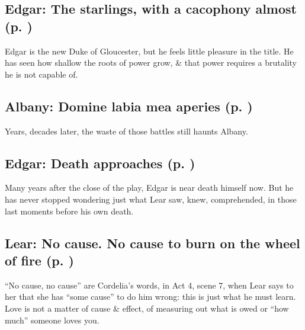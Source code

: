 \subsection*{Edgar: The starlings, with a cacophony almost (p. \pageref{ch:lear_bs})}
Edgar is the new Duke of Gloucester, but he feels little pleasure in the title. He has seen how shallow the roots of power grow, \& that power requires a brutality he is not capable of.

\subsection*{Albany: Domine labia mea aperies (p. \pageref{ch:lear_bt})}
Years, decades later, the waste of those battles still haunts Albany.

\subsection*{Edgar: Death approaches (p. \pageref{ch:lear_bu})}
Many years after the close of the play, Edgar is near death himself now. But he has never stopped wondering just what Lear saw, knew, comprehended, in those last moments before his own death.

\subsection*{Lear: No cause. No cause to burn on the wheel of fire (p. \pageref{ch:lear_bv})}
``No cause, no cause'' are Cordelia's words, in Act 4, scene 7, when Lear says to her that she has ``some cause'' to do him wrong: this is just what he must learn. Love is not a matter of cause \& effect, of measuring out what is owed or ``how much'' someone loves you.